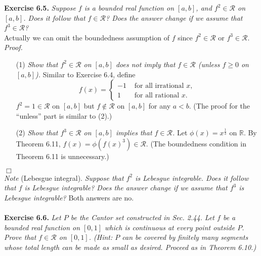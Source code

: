 \documentclass{article}
\begin{document}



\textbf{Exercise 6.5.}
\emph{Suppose $f$ is a bounded real function on $[a,b]$,
and $f^2 \in \mathscr{R}$ on $[a,b]$.
Does it follow that $f \in \mathscr{R}$?
Does the answer change if we assume that $f^3 \in \mathscr{R}$?} \\

Actually we can omit the boundedness assumption of $f$
since $f^2 \in \mathscr{R}$ or $f^3 \in \mathscr{R}$. \\

\emph{Proof.}
\begin{enumerate}
\item[(1)]
\emph{Show that $f^2 \in \mathscr{R}$ on $[a,b]$ does not imply that
$f \in \mathscr{R}$ (unless $f \geq 0$ on $[a,b]$).}
Similar to Exercise 6.4,
define
\begin{equation*}
  f(x) =
    \begin{cases}
      -1 & \text{ for all irrational $x$}, \\
      1 & \text{ for all rational $x$}.
    \end{cases}
\end{equation*}
$f^2 = 1 \in \mathscr{R}$ on $[a,b]$ but
$f \not\in \mathscr{R}$ on $[a,b]$ for any $a < b$.
(The proof for the ``unless'' part is similar to (2).)

\item[(2)]
\emph{Show that $f^3 \in \mathscr{R}$ on $[a,b]$ implies that
$f \in \mathscr{R}$.}
Let $\phi(x) = x^{\frac{1}{3}}$ on $\mathbb{R}$.
By Theorem 6.11, $f(x) = \phi(f(x)^3) \in \mathscr{R}$.
(The boundedness condition in Theorem 6.11 is unnecessary.)
\end{enumerate}
$\Box$ \\



\emph{Note}
(Lebesgue integral).
\emph{Suppose that $f^2$ is Lebesgue integrable.
Does it follow that $f$ is Lebesgue integrable?
Does the answer change if we assume that $f^3$ is Lebesgue integrable?}
Both answers are no. \\\\






\textbf{Exercise 6.6.}
\emph{Let $P$ be the Cantor set constructed in Sec. 2.44.
Let $f$ be a bounded real function on $[0,1]$ which is continuous at every point outside $P$.
Prove that $f \in \mathscr{R}$ on $[0,1]$.
(Hint: $P$ can be covered by finitely many segments
whose total length can be made as small as desired. Proceed as in Theorem 6.10.)} \\
\end{document}
